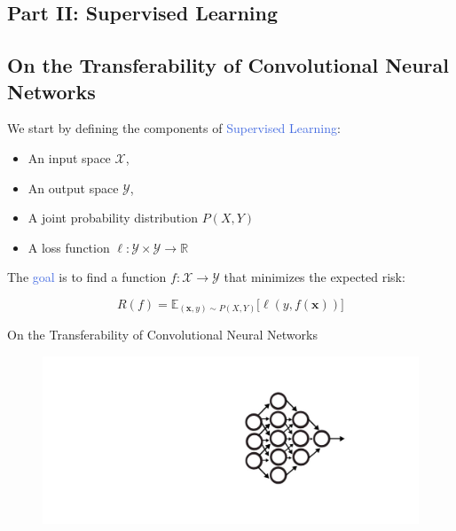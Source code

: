 \documentclass{beamer}
\renewcommand{\vec}[1]{\mathbf{#1}
}
\begin{document}
\begin{frame}
	\section{Part II: Supervised Learning}
	\subsection{On the Transferability of Convolutional Neural Networks}

	We start by defining the components of \textcolor{RoyalBlue}{Supervised Learning}:

	\begin{itemize}
		\item An input space $\mathcal{X}$,
		\item An output space $\mathcal{Y}$,
		\item A joint probability distribution $P(X,Y)$
		\item A loss function $\ell: \mathcal{Y} \times \mathcal{Y} \rightarrow \mathds{R}$
	\end{itemize}

	\bigskip

	The \textcolor{RoyalBlue}{goal} is to find a function $f:\mathcal{X}\rightarrow\mathcal{Y}$ that minimizes the expected risk:

	\begin{equation*}
		R(f) = \mathds{E}_{(\vec{x},y)\sim P(X,Y)} \big[\ell(y,f(\vec{x}))\big]
	\end{equation*}
\end{frame}


\begin{frame}{On the Transferability of Convolutional Neural Networks}
	\bigskip

	\begin{figure}
		\includegraphics[width=1.2\textwidth]{figures/tl_}
	\end{figure}
	 
\end{frame}
\end{document}
